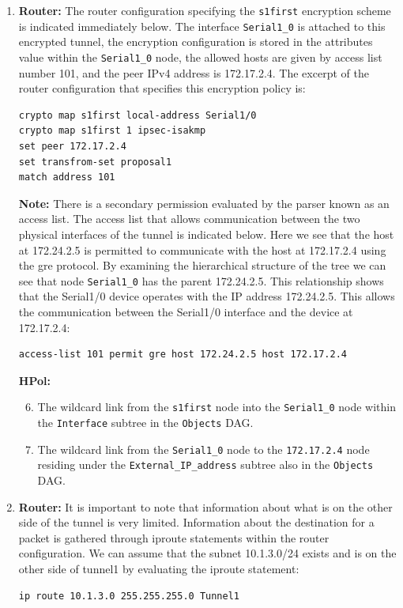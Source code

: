 \documentclass[12pt,letterpaper]{report}
\newcommand{\node}[1]{\texttt{#1}}
\newcommand{\tbf}[1]{\textbf{#1}}
\begin{document}
\begin{enumerate}
{		%
	}
	\item%
	{%
		{\tbf{Router:} The router configuration specifying the {\node{s1first}} encryption scheme is indicated immediately below. The interface {\node{Serial1\_0}} is attached to this encrypted tunnel, the encryption configuration is stored in the attributes value within the {\node{Serial1\_0}} node, the allowed hosts are given by access list number 101, and the peer IPv4 address is 172.17.2.4. The excerpt of the router configuration that specifies this encryption policy is:}
		\begin{lstlisting}[style=hermes]
crypto map s1first local-address Serial1/0
crypto map s1first 1 ipsec-isakmp
set peer 172.17.2.4
set transfrom-set proposal1
match address 101
		\end{lstlisting}
		
		{\tbf{Note:} There is a secondary permission evaluated by the parser known as an access list. The access list that allows communication between the two physical interfaces of the tunnel is indicated below. Here we see that the host at 172.24.2.5 is permitted to communicate with the host at 172.17.2.4 using the gre protocol. By examining the hierarchical structure of the tree we can see that node {\node{Serial1\_0}} has the parent 172.24.2.5. This relationship shows that the Serial1/0 device operates with the IP address 172.24.2.5. This allows the communication between the Serial1/0 interface and the device at 172.17.2.4:}
		\begin{lstlisting}[style=hermes]
access-list 101 permit gre host 172.24.2.5 host 172.17.2.4
		\end{lstlisting}
		
		{\tbf{HPol:}}
		\begin{enumerate}
			\setcounter{enumii}{5}
			\item {The wildcard link from the {\node{s1first}} node into the {\node{Serial1\_0}} node within the {\node{Interface}} subtree in the \texttt{Objects} DAG.}
			\item {The wildcard link from the {\node{Serial1\_0}} node to the {\node{172.17.2.4}} node residing under the {\node{External\_IP\_address}} subtree also in the \texttt{Objects} DAG.}
		\end{enumerate}
		
	}
	\item%
	{%
		{\tbf{Router:} It is important to note that information about what is on the other side of the tunnel is very limited. Information about the destination for a packet is gathered through iproute statements within the router configuration. We can assume that the subnet 10.1.3.0/24 exists and is on the other side of tunnel1 by evaluating the iproute statement:}
		\begin{lstlisting}[style=hermes,]
ip route 10.1.3.0 255.255.255.0 Tunnel1
		\end{lstlisting}
		
}
\end{enumerate}
\end{document}
